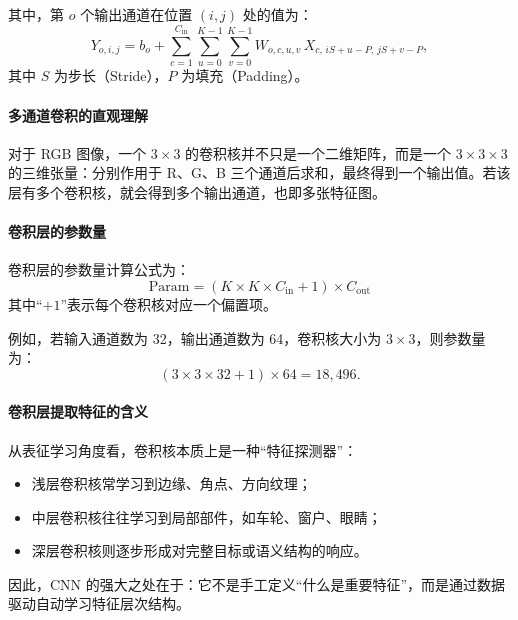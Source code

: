 其中，第 $o$ 个输出通道在位置 $(i,j)$ 处的值为：
\begin{equation}
Y_{o,i,j}
=
b_o
+
\sum_{c=1}^{C_{\text{in}}}
\sum_{u=0}^{K-1}
\sum_{v=0}^{K-1}
W_{o,c,u,v}\,
X_{c,\,iS+u-P,\,jS+v-P},
\end{equation}
其中 $S$ 为步长（Stride），$P$ 为填充（Padding）。

\paragraph{多通道卷积的直观理解}
对于 RGB 图像，一个 $3\times3$ 的卷积核并不只是一个二维矩阵，而是一个 $3\times3\times3$ 的三维张量：分别作用于 R、G、B 三个通道后求和，最终得到一个输出值。若该层有多个卷积核，就会得到多个输出通道，也即多张特征图。

\paragraph{卷积层的参数量}
卷积层的参数量计算公式为：
\begin{equation}
\text{Param} = (K \times K \times C_{\text{in}} + 1)\times C_{\text{out}}
\end{equation}
其中“$+1$”表示每个卷积核对应一个偏置项。

例如，若输入通道数为 32，输出通道数为 64，卷积核大小为 $3\times3$，则参数量为：
\[
(3\times3\times32+1)\times64 = 18{,}496.
\]

\paragraph{卷积层提取特征的含义}
从表征学习角度看，卷积核本质上是一种“特征探测器”：
\begin{itemize}
    \item 浅层卷积核常学习到边缘、角点、方向纹理；
    \item 中层卷积核往往学习到局部部件，如车轮、窗户、眼睛；
    \item 深层卷积核则逐步形成对完整目标或语义结构的响应。
\end{itemize}
因此，CNN 的强大之处在于：它不是手工定义“什么是重要特征”，而是通过数据驱动自动学习特征层次结构。

